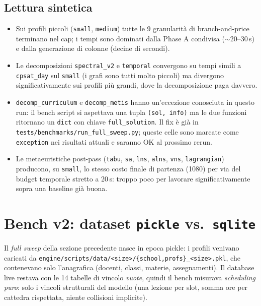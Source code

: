 \subsection{Lettura sintetica}

\begin{ideabox}
\begin{itemize}
\item Sui profili piccoli (\texttt{small}, \texttt{medium})
  tutte le 9 granularit\`a di branch-and-price terminano nel
  cap; i tempi sono dominati dalla Phase A condivisa
  ($\sim 20$--$30$\,s) e dalla generazione di colonne (decine
  di secondi).
\item Le decomposizioni \texttt{spectral\_v2} e
  \texttt{temporal} convergono su tempi simili a
  \texttt{cpsat\_day} sul \texttt{small} (i grafi sono
  tutti molto piccoli) ma divergono significativamente
  sui profili pi\`u grandi, dove la decomposizione paga
  davvero.
\item \texttt{decomp\_curriculum} e \texttt{decomp\_metis}
  hanno un'eccezione conosciuta in questo run: il bench
  script si aspettava una tupla \texttt{(sol, info)} ma le
  due funzioni ritornano un \texttt{dict} con chiave
  \texttt{full\_solution}. Il fix \`e gi\`a in
  \texttt{tests/benchmarks/run\_full\_sweep.py}; queste
  celle sono marcate come \texttt{exception} nei risultati
  attuali e saranno OK al prossimo rerun.
\item Le metaeuristiche post-pass (\texttt{tabu},
  \texttt{sa}, \texttt{lns}, \texttt{alns}, \texttt{vns},
  \texttt{lagrangian}) producono, su \texttt{small}, lo
  stesso costo finale di partenza (1080) per via del
  budget temporale stretto a 20\,s: troppo poco per
  lavorare significativamente sopra una baseline gi\`a
  buona.
\end{itemize}
\end{ideabox}

\section{Bench v2: dataset \texttt{pickle} vs.\ \texttt{sqlite}}
\label{sec:bench-v2}


Il \emph{full sweep} della sezione precedente nasce in epoca
pickle: i profili venivano caricati da
\texttt{engine/scripts/data/<size>/\{school,profs\}\_<size>.pkl},
che contenevano solo l'anagrafica (docenti, classi, materie,
assegnamenti). Il database live restava con le 14 tabelle di
vincolo \emph{vuote}, quindi il bench misurava \emph{scheduling
puro}: solo i vincoli strutturali del modello (una lezione per
slot, somma ore per cattedra rispettata, niente collisioni
implicite).

